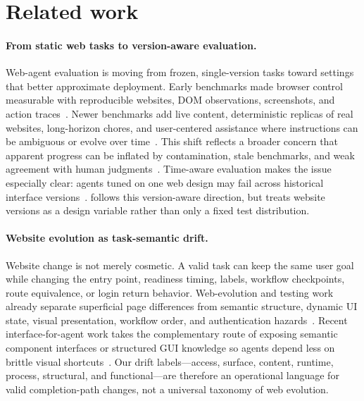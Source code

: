 \section{Related work}

\paragraph{From static web tasks to version-aware evaluation.}
Web-agent evaluation is moving from frozen, single-version tasks toward settings that better approximate deployment. Early benchmarks made browser control measurable with reproducible websites, DOM observations, screenshots, and action traces~\citep{zhou2023webarena,deng2023mind2web,koh2024visualwebarena}. Newer benchmarks add live content, deterministic replicas of real websites, long-horizon chores, and user-centered assistance where instructions can be ambiguous or evolve over time~\citep{yuan2024webcanvas,real2025,webchorearena2025,realwebassist2025}. This shift reflects a broader concern that apparent progress can be inflated by contamination, stale benchmarks, and weak agreement with human judgments~\citep{xue2025illusion}. Time-aware evaluation makes the issue especially clear: agents tuned on one web design may fail across historical interface versions~\citep{timewarp2026}. \webcoevo{} follows this version-aware direction, but treats website versions as a design variable rather than only a fixed test distribution.

\paragraph{Website evolution as task-semantic drift.}
Website change is not merely cosmetic. A valid task can keep the same user goal while changing the entry point, readiness timing, labels, workflow checkpoints, route equivalence, or login return behavior. Web-evolution and testing work already separate superficial page differences from semantic structure, dynamic UI state, visual presentation, workflow order, and authentication hazards~\citep{shao2021webevo,mesbah2012crawling,macchi2021imagebased,sanchez2011workflow,jonker2018shepherd}. Recent interface-for-agent work takes the complementary route of exposing semantic component interfaces or structured GUI knowledge so agents depend less on brittle visual shortcuts~\citep{ci4a2026,graphpilot2026}. Our drift labels---access, surface, content, runtime, process, structural, and functional---are therefore an operational language for valid completion-path changes, not a universal taxonomy of web evolution.

